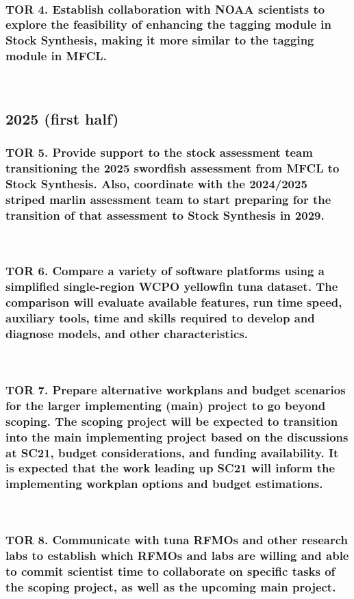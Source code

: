\documentclass{SCreport}
\begin{document}
~

\subsubsection{TOR 4. Establish collaboration with NOAA scientists to explore
  the feasibility of enhancing the tagging module in Stock Synthesis, making it
  more similar to the tagging module in MFCL.}

~

\subsection{2025 (first half)}

\subsubsection{TOR 5. Provide support to the stock assessment team transitioning
  the 2025 swordfish assessment from MFCL to Stock Synthesis. Also, coordinate
  with the 2024/2025 striped marlin assessment team to start preparing for the
  transition of that assessment to Stock Synthesis in 2029.}

~

\subsubsection{TOR 6. Compare a variety of software platforms using a simplified
  single-region WCPO yellowfin tuna dataset. The comparison will evaluate
  available features, run time speed, auxiliary tools, time and skills required
  to develop and diagnose models, and other characteristics.}

~

\subsubsection{TOR 7. Prepare alternative workplans and budget scenarios for the
  larger implementing (main) project to go beyond scoping. The scoping project
  will be expected to transition into the main implementing project based on the
  discussions at SC21, budget considerations, and funding availability. It is
  expected that the work leading up SC21 will inform the implementing workplan
  options and budget estimations.}

~

\subsubsection{TOR 8. Communicate with tuna RFMOs and other research labs to
  establish which RFMOs and labs are willing and able to commit scientist time
  to collaborate on specific tasks of the scoping project, as well as the
  upcoming main project.}
\end{document}
